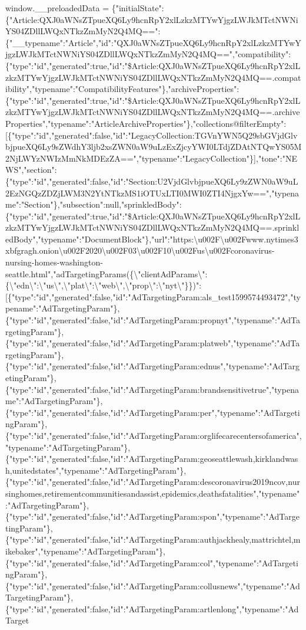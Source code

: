 window.\_\_preloadedData =
\{"initialState":\{"Article:QXJ0aWNsZTpueXQ6Ly9hcnRpY2xlLzkzMTYwYjgzLWJkMTctNWNiYS04ZDllLWQxNTkzZmMyN2Q4MQ==":\{"\_\_typename":"Article","id":"QXJ0aWNsZTpueXQ6Ly9hcnRpY2xlLzkzMTYwYjgzLWJkMTctNWNiYS04ZDllLWQxNTkzZmMyN2Q4MQ==","compatibility":\{"type":"id","generated":true,"id":"\$Article:QXJ0aWNsZTpueXQ6Ly9hcnRpY2xlLzkzMTYwYjgzLWJkMTctNWNiYS04ZDllLWQxNTkzZmMyN2Q4MQ==.compatibility","typename":"CompatibilityFeatures"\},"archiveProperties":\{"type":"id","generated":true,"id":"\$Article:QXJ0aWNsZTpueXQ6Ly9hcnRpY2xlLzkzMTYwYjgzLWJkMTctNWNiYS04ZDllLWQxNTkzZmMyN2Q4MQ==.archiveProperties","typename":"ArticleArchiveProperties"\},"collections@filterEmpty":{[}\{"type":"id","generated":false,"id":"LegacyCollection:TGVnYWN5Q29sbGVjdGlvbjpueXQ6Ly9sZWdhY3ljb2xsZWN0aW9uLzExZjcyYWI0LTdjZDAtNTQwYS05M2NjLWYzNWIzMmNkMDEzZA==","typename":"LegacyCollection"\}{]},"tone":"NEWS","section":\{"type":"id","generated":false,"id":"Section:U2VjdGlvbjpueXQ6Ly9zZWN0aW9uL2EzNGQzZDZjLWM3N2YtNTkzMS1iOTUxLTI0MWI0ZTI4NjgxYw==","typename":"Section"\},"subsection":null,"sprinkledBody":\{"type":"id","generated":true,"id":"\$Article:QXJ0aWNsZTpueXQ6Ly9hcnRpY2xlLzkzMTYwYjgzLWJkMTctNWNiYS04ZDllLWQxNTkzZmMyN2Q4MQ==.sprinkledBody","typename":"DocumentBlock"\},"url":"https:\textbackslash{}u002F\textbackslash{}u002Fwww.nytimes3xbfgragh.onion\textbackslash{}u002F2020\textbackslash{}u002F03\textbackslash{}u002F10\textbackslash{}u002Fus\textbackslash{}u002Fcoronavirus-nursing-homes-washington-seattle.html","adTargetingParams(\{\textbackslash{}"clientAdParams\textbackslash{}":\{\textbackslash{}"edn\textbackslash{}":\textbackslash{}"us\textbackslash{}",\textbackslash{}"plat\textbackslash{}":\textbackslash{}"web\textbackslash{}",\textbackslash{}"prop\textbackslash{}":\textbackslash{}"nyt\textbackslash{}"\}\})":{[}\{"type":"id","generated":false,"id":"AdTargetingParam:als\_test1599574493472","typename":"AdTargetingParam"\},\{"type":"id","generated":false,"id":"AdTargetingParam:propnyt","typename":"AdTargetingParam"\},\{"type":"id","generated":false,"id":"AdTargetingParam:platweb","typename":"AdTargetingParam"\},\{"type":"id","generated":false,"id":"AdTargetingParam:ednus","typename":"AdTargetingParam"\},\{"type":"id","generated":false,"id":"AdTargetingParam:brandsensitivetrue","typename":"AdTargetingParam"\},\{"type":"id","generated":false,"id":"AdTargetingParam:per","typename":"AdTargetingParam"\},\{"type":"id","generated":false,"id":"AdTargetingParam:orglifecarecentersofamerica","typename":"AdTargetingParam"\},\{"type":"id","generated":false,"id":"AdTargetingParam:geoseattlewash,kirklandwash,unitedstates","typename":"AdTargetingParam"\},\{"type":"id","generated":false,"id":"AdTargetingParam:descoronavirus2019ncov,nursinghomes,retirementcommunitiesandassist,epidemics,deathsfatalities","typename":"AdTargetingParam"\},\{"type":"id","generated":false,"id":"AdTargetingParam:spon","typename":"AdTargetingParam"\},\{"type":"id","generated":false,"id":"AdTargetingParam:authjackhealy,mattrichtel,mikebaker","typename":"AdTargetingParam"\},\{"type":"id","generated":false,"id":"AdTargetingParam:col","typename":"AdTargetingParam"\},\{"type":"id","generated":false,"id":"AdTargetingParam:collusnews","typename":"AdTargetingParam"\},\{"type":"id","generated":false,"id":"AdTargetingParam:artlenlong","typename":"AdTarget